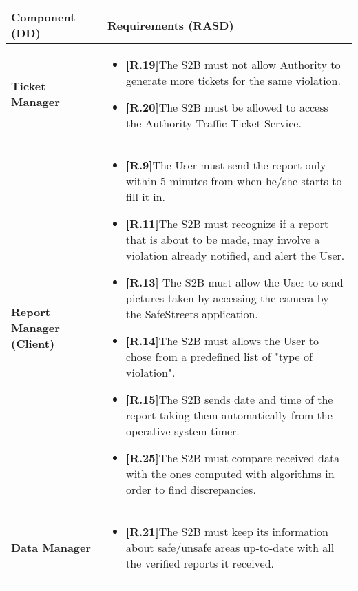 \begin{table}[H]
\advance\leftskip-1.5cm
\begin{tabular}{|l|p{}|}
\hline
\textbf{\textbf{Component (DD)}}             &    \textbf{Requirements (RASD)}                                                           \\ \hline

\textbf{Ticket Manager}   &  \begin{itemize}
    \item \textbf{[R.19]}The S2B must not allow Authority \newline to generate more tickets for the same violation.
    
    \item \textbf{[R.20]}The S2B must be allowed to access the Authority Traffic Ticket Service.
\end{itemize}  \\ \hline


\textbf{Report Manager (Client)}   & \begin{itemize}
    \item \textbf{[R.9]}The User must send the report only within 5 minutes from when he/she starts to fill it in.
    \item \textbf{ [R.11]}The S2B must recognize if a report that is about to be made, may involve a violation already notified, and alert the User.
    \item \textbf{[R.13]} The S2B must allow the User to send pictures taken by accessing the camera by the SafeStreets application.
    \item \textbf{[R.14]}The S2B must allows the User to chose from a predefined list of "type of
    violation".
    \item \textbf{[R.15]}The S2B sends date and time of the report taking them automatically from the operative system timer.
    
    \item \textbf{[R.25]}The S2B must compare received data with the ones computed with algorithms in order to find discrepancies.
    
\end{itemize}    \\ \hline




\textbf{Data Manager}    &  \begin{itemize}
    \item \textbf{[R.21]}The S2B must keep its information about safe/unsafe areas up-to-date with all the verified reports it received.
    

\end{itemize}
\end{tabular}
\end{table}
